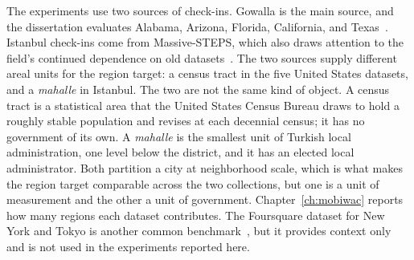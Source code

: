 The experiments use two sources of check-ins. Gowalla is the main source, and the
dissertation evaluates Alabama, Arizona, Florida, California, and
Texas~\cite{cho2011gowalla}. Istanbul check-ins come from Massive-STEPS, which also
draws attention to the field's continued dependence on old
datasets~\cite{wongso2025massivesteps}. The two sources supply different areal units
for the region target: a census tract in the five United States datasets, and a
\emph{mahalle} in Istanbul. The two are not the same kind of object. A census tract is a
statistical area that the United States Census Bureau draws to hold a roughly stable
population and revises at each decennial census; it has no government of its own. A
\emph{mahalle} is the smallest unit of Turkish local administration, one level below
the district, and it has an elected local administrator. Both partition a city at
neighborhood scale, which is what makes the region target comparable across the two
collections, but one is a unit of measurement and the other a unit of government.
Chapter~\ref{ch:mobiwac} reports how many regions each dataset contributes. The Foursquare dataset for New
York and Tokyo
is another common benchmark~\cite{yang2015tsmc}, but it provides context only and is
not used in the experiments reported here.
